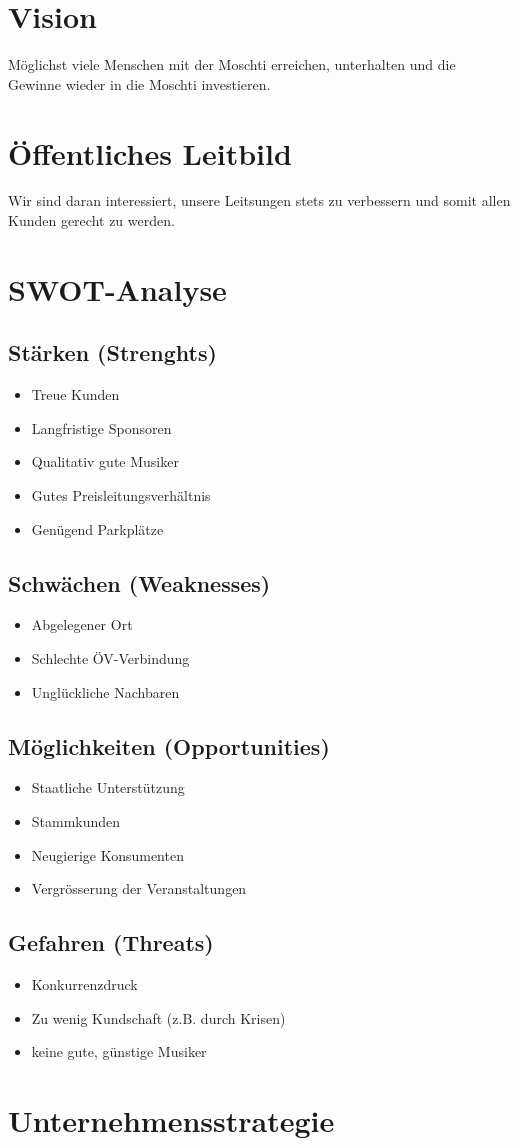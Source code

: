 \documentclass[a4paper, titlepage]{article}
\begin{document}
\section{Vision}
Möglichst viele Menschen mit der Moschti erreichen, unterhalten und die Gewinne wieder in die Moschti investieren. 
\section{Öffentliches Leitbild}
Wir sind daran interessiert, unsere Leitsungen stets zu verbessern und somit allen Kunden gerecht zu werden.
\section{SWOT-Analyse}
\subsection{Stärken (Strenghts)}
\begin{itemize}
  \item Treue Kunden
  \item Langfristige Sponsoren
  \item Qualitativ gute Musiker
  \item Gutes Preisleitungsverhältnis
  \item Genügend Parkplätze
\end{itemize}
\subsection{Schwächen (Weaknesses)}
\begin{itemize}
  \item Abgelegener Ort
  \item Schlechte ÖV-Verbindung
  \item Unglückliche Nachbaren
\end{itemize}
\subsection{Möglichkeiten (Opportunities)}
\begin{itemize}
  \item Staatliche Unterstützung
  \item Stammkunden
  \item Neugierige Konsumenten
  \item Vergrösserung der Veranstaltungen
\end{itemize}
\subsection{Gefahren (Threats)}
\begin{itemize}
  \item Konkurrenzdruck
  \item Zu wenig Kundschaft (z.B. durch Krisen)
  \item keine gute, günstige Musiker
\end{itemize}
\section{Unternehmensstrategie}
\end{document}
